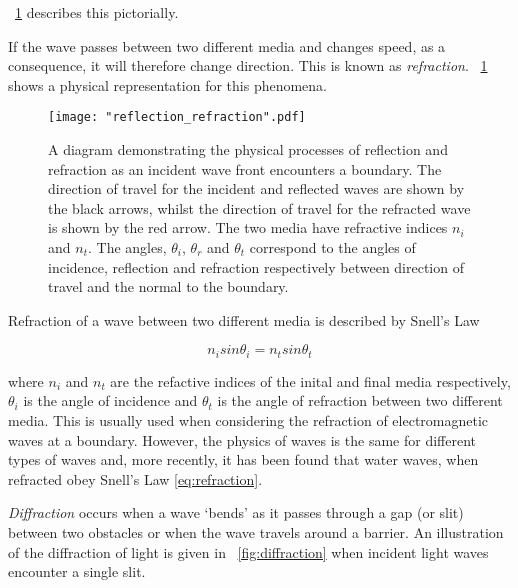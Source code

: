 \documentclass{article}
\newcommand{\figref}[2][\figurename~]{#1\ref{#2}}
\begin{document}
\vspace{2mm}
\noindent
\figref{fig:reflection_refraction} describes this pictorially.

\vspace{2mm}
\noindent
If the wave passes between two different media and changes speed, as a consequence, it will therefore change direction. This is known as \textit{refraction}. \figref{fig:reflection_refraction} shows a physical representation for this phenomena.

\begin{figure}[h]
\centering
\texttt{[image: "reflection\_refraction".pdf]}
\caption{A diagram demonstrating the physical processes of reflection and refraction as an incident wave front encounters a boundary. The direction of travel for the incident and reflected waves are shown by the black arrows, whilst the direction of travel for the refracted wave is shown by the red arrow. The two media have refractive indices $n_i$ and $n_t$. The angles, $\theta_i$, $\theta_r$ and $\theta_t$ correspond to the angles of incidence, reflection and refraction respectively between direction of travel and the normal to the boundary.}
\label{fig:reflection_refraction}
\end{figure}

\vspace{2mm}
\noindent
Refraction of a wave between two different media is described by Snell's Law

\begin{equation}
\label{eq:refraction}
n_i sin{\theta_i} = n_t sin{\theta_t}
\end{equation}


\vspace{2mm}
\noindent
where $n_i$ and $n_t$ are the refactive indices of the inital and final media respectively, $\theta_i$ is the angle of incidence and $\theta_t$ is the angle of refraction between two different media. This is usually used when considering the refraction of electromagnetic waves at a boundary. However, the physics of waves is the same for different types of waves and, more recently, it has been found \cite{Web02} that water waves, when refracted obey Snell's Law \eqref{eq:refraction}.


\vspace{2mm}
\noindent
\textit{Diffraction} occurs when a wave `bends' as it passes through a gap (or slit) between two obstacles or when the wave travels around a barrier. An illustration of the diffraction of light is given in \figref{fig:diffraction} when incident light waves encounter a single slit.
\end{document}
